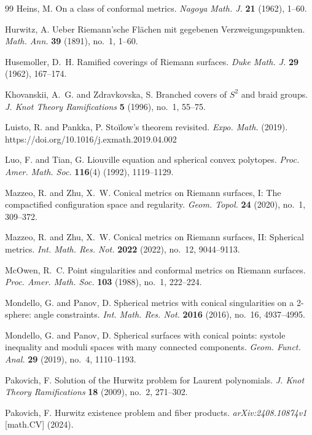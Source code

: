 \documentclass[microtype]{gtpart}     %
\theoremstyle{definition}
\begin{document}
\begin{thebibliography}{99}
Heins, M.
On a class of conformal metrics.
\textit{Nagoya Math. J.} \textbf{21} (1962), 1--60.

Hurwitz, A.
Ueber Riemann'sche Fl\"achen mit gegebenen Verzweigungspunkten.
\textit{Math. Ann.} \textbf{39} (1891), no.~1, 1--60.

Husemoller, D.~H.
Ramified coverings of Riemann surfaces.
\textit{Duke Math. J.} \textbf{29} (1962), 167--174.

Khovanskii, A.~G. and Zdravkovska, S.
Branched covers of $S^{2}$ and braid groups.
\textit{J. Knot Theory Ramifications} \textbf{5} (1996), no.~1, 55--75.



Luisto, R. and Pankka, P.
Sto\"ilow's theorem revisited.
\textit{Expo. Math.} (2019).
https://doi.org/10.1016/j.exmath.2019.04.002

Luo, F. and Tian, G.
Liouville equation and spherical convex polytopes.
\textit{Proc. Amer. Math. Soc.} \textbf{116}(4) (1992), 1119--1129.


Mazzeo, R. and Zhu, X.~W.
Conical metrics on Riemann surfaces, I: The compactified configuration space and regularity.
\textit{Geom. Topol.} \textbf{24} (2020), no.~1, 309--372.

Mazzeo, R. and Zhu, X.~W.
Conical metrics on Riemann surfaces, II: Spherical metrics.
\textit{Int. Math. Res. Not.} \textbf{2022} (2022), no.~12, 9044--9113.

McOwen, R.~C.
Point singularities and conformal metrics on Riemann surfaces.
\textit{Proc. Amer. Math. Soc.} \textbf{103} (1988), no.~1, 222--224.


Mondello, G. and Panov, D.
Spherical metrics with conical singularities on a 2-sphere: angle constraints.
\textit{Int. Math. Res. Not.} \textbf{2016} (2016), no.~16, 4937--4995.

Mondello, G. and Panov, D.
Spherical surfaces with conical points: systole inequality and moduli spaces with many connected components.
\textit{Geom. Funct. Anal.} \textbf{29} (2019), no.~4, 1110--1193.




Pakovich, F.
Solution of the Hurwitz problem for Laurent polynomials.
\textit{J. Knot Theory Ramifications} \textbf{18} (2009), no.~2, 271--302.

Pakovich, F.
Hurwitz existence problem and fiber products.
\textit{arXiv:2408.10874v1} [math.CV] (2024).


\end{thebibliography}
\end{document}
